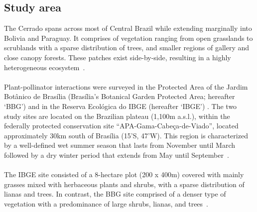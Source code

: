 \documentclass[11pt]{article}
\begin{document}
\subsection{Study area}
The Cerrado spans across most of Central Brazil while extending marginally into Bolivia and Paraguay. It comprises of vegetation ranging from open grasslands to scrublands with a sparse distribution of trees, and smaller regions of gallery and close canopy forests. These patches exist side-by-side, resulting in a highly heterogeneous ecosystem~\citep{Gottsberger2006}. \\
\\
Plant-pollinator interactions were surveyed in the Protected Area of the Jardim Bot\^anico de Bras\'ilia (Bras\'ilia's Botanical Garden Protected Area; hereafter `BBG') and in the Reserva Ecol\'ogica do IBGE (hereafter `IBGE') . The two study sites are located on the Brazilian plateau (1,100m a.s.l.), within the federally protected conservation site ``APA-Gama-Cabe\c ca-de-Viado'', located approximately 30km south of Bras\'ilia (15'S, 47'W). This region is characterized by a well-defined wet summer season that lasts from November until March followed by a dry winter period that extends from May until September~\citep{Gottsberger2006a}.\\
\\
The IBGE site consisted of a 8-hectare plot (200 x 400m) covered with mainly grasses mixed with herbaceous plants and shrubs, with a sparse distribution of lianas and trees. In contrast, the BBG site comprised of a denser type of vegetation with a predominance of large shrubs, lianas, and trees~\citep{Eiten1972}.
\end{document}

